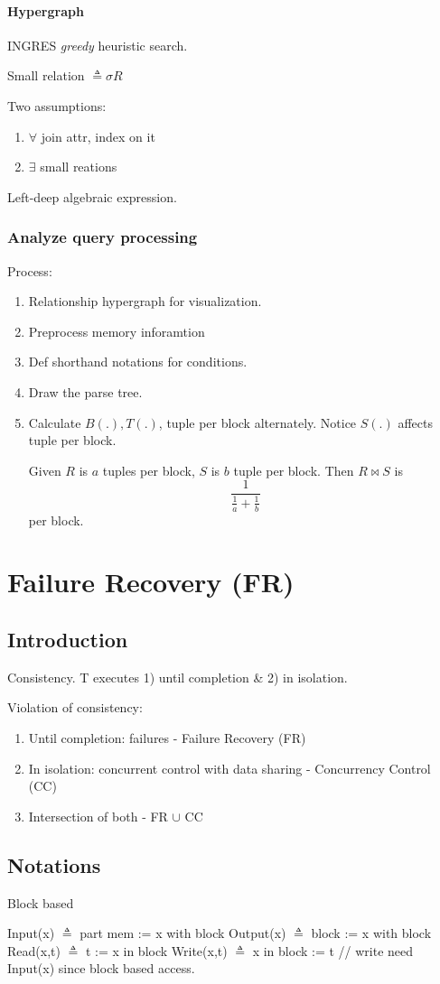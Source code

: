 \documentclass[a4paper]{report}
\begin{document}
\subsubsection{Hypergraph}
INGRES \textit{greedy} heuristic search. 

Small relation $\triangleq \sigma R$  

Two assumptions:
\begin{enumerate}
\item $\forall$ join attr, index on it
\item $\exists$  small reations
\end{enumerate}
Left-deep algebraic expression.
\subsection{Analyze query processing}
Process:
\begin{enumerate}
\item Relationship hypergraph for visualization. 
\item Preprocess memory inforamtion 
\item Def shorthand notations for conditions. 
\item Draw the parse tree. 
\item Calculate $B(.), T(.)$, tuple per block alternately. Notice $S(.)$ affects tuple per block. 

Given $R$ is $a$ tuples per block, $S$ is $b$ tuple per block. Then $R\bowtie S$ is $$
\frac{1}{\frac{1}{a}+\frac{1}{b}} 
$$
per block. 
\end{enumerate}
\chapter{Failure Recovery (FR)}
\section*{Introduction}
Consistency. T executes 1) until completion \& 2) in isolation. 

Violation of consistency: 
\begin{enumerate}
\item Until completion: failures - Failure Recovery (FR)
\item In isolation: concurrent control with data sharing - Concurrency Control
(CC)
\item Intersection of both - FR $\cup$ CC
\end{enumerate}

\section{Notations}
Block based 
\begin{enumerate}
\treeitem Input(x) $\triangleq$ part mem := x with block 
\treeitem Output(x) $\triangleq$ block := x with block
\treeitem Read(x,t) $\triangleq$ t := x in block 
\treeitem Write(x,t) $\triangleq$ x in block := t // write need Input(x) since block based access.
\end{enumerate}
\end{document}
